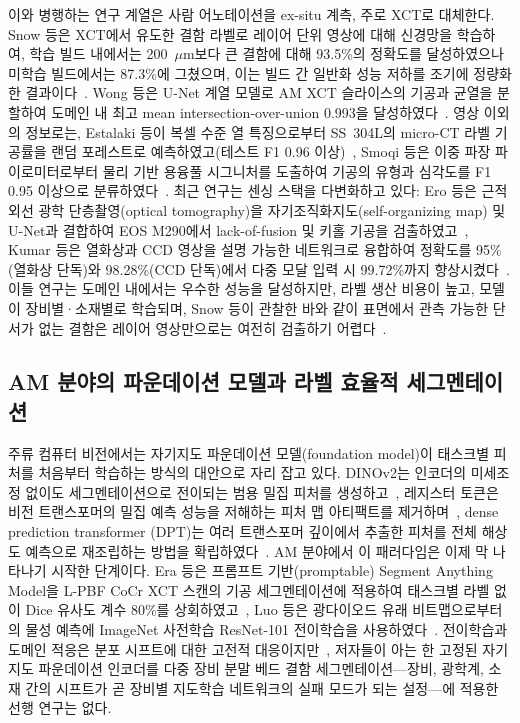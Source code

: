 이와 병행하는 연구 계열은 사람 어노테이션을 ex-situ 계측, 주로 XCT로
대체한다. Snow 등은 XCT에서 유도한 결함 라벨로 레이어 단위 영상에 대해
신경망을 학습하여, 학습 빌드 내에서는 200~$\mu$m보다 큰 결함에 대해 93.5\%의
정확도를 달성하였으나 미학습 빌드에서는 87.3\%에 그쳤으며, 이는 빌드 간
일반화 성능 저하를 조기에 정량화한 결과이다~\cite{Snow2021Layerwise}. Wong
등은 U-Net 계열 모델로 AM XCT 슬라이스의 기공과 균열을 분할하여 도메인 내
최고 mean intersection-over-union 0.993을 달성하였다~\cite{Wong2022UNet}.
영상 이외의 정보로는, Estalaki 등이 복셀 수준 열 특징으로부터 SS~304L의
micro-CT 라벨 기공률을 랜덤 포레스트로 예측하였고(테스트 F1 0.96
이상)~\cite{Estalaki2022Voxel}, Smoqi 등은 이중 파장 파이로미터로부터 물리
기반 용융풀 시그니처를 도출하여 기공의 유형과 심각도를 F1 0.95 이상으로
분류하였다~\cite{Smoqi2022Meltpool}. 최근 연구는 센싱 스택을 다변화하고
있다: Ero 등은 근적외선 광학 단층촬영(optical tomography)을
자기조직화지도(self-organizing map) 및 U-Net과 결합하여 EOS M290에서
lack-of-fusion 및 키홀 기공을 검출하였고~\cite{Ero2023OT}, Kumar 등은
열화상과 CCD 영상을 설명 가능한 네트워크로 융합하여 정확도를 95\%(열화상
단독)와 98.28\%(CCD 단독)에서 다중 모달 입력 시 99.72\%까지
향상시켰다~\cite{Kumar2024MultiSource}. 이들 연구는 도메인 내에서는 우수한
성능을 달성하지만, 라벨 생산 비용이 높고, 모델이 장비별·소재별로 학습되며,
Snow 등이 관찰한 바와 같이 표면에서 관측 가능한 단서가 없는 결함은 레이어
영상만으로는 여전히 검출하기 어렵다~\cite{Snow2021Layerwise}.

\subsection{AM 분야의 파운데이션 모델과 라벨 효율적 세그멘테이션}
\label{sec:related-foundation}

주류 컴퓨터 비전에서는 자기지도 파운데이션 모델(foundation model)이 태스크별
피처를 처음부터 학습하는 방식의 대안으로 자리 잡고 있다. DINOv2는 인코더의
미세조정 없이도 세그멘테이션으로 전이되는 범용 밀집 피처를
생성하고~\cite{Oquab2024DINOv2}, 레지스터 토큰은 비전 트랜스포머의 밀집 예측
성능을 저해하는 피처 맵 아티팩트를 제거하며~\cite{Darcet2024Registers},
dense prediction transformer (DPT)는 여러 트랜스포머 깊이에서 추출한 피처를
전체 해상도 예측으로 재조립하는 방법을 확립하였다~\cite{Ranftl2021DPT}. AM
분야에서 이 패러다임은 이제 막 나타나기 시작한 단계이다. Era 등은 프롬프트
기반(promptable) Segment Anything Model을 L-PBF CoCr XCT 스캔의 기공
세그멘테이션에 적용하여 태스크별 라벨 없이 Dice 유사도 계수 80\%를
상회하였고~\cite{Era2025SAM}, Luo 등은 광다이오드 유래 비트맵으로부터의 물성
예측에 ImageNet 사전학습 ResNet-101 전이학습을
사용하였다~\cite{Luo2025TransferTi}. 전이학습과 도메인 적응은 분포 시프트에
대한 고전적 대응이지만~\cite{Pan2010TransferLearning,Quinonero2009DatasetShift,Torralba2011DatasetBias},
저자들이 아는 한 고정된 자기지도 파운데이션 인코더를 다중 장비 분말 베드 결함
세그멘테이션---장비, 광학계, 소재 간의 시프트가 곧 장비별 지도학습
네트워크의 실패 모드가 되는 설정---에 적용한 선행 연구는 없다.

